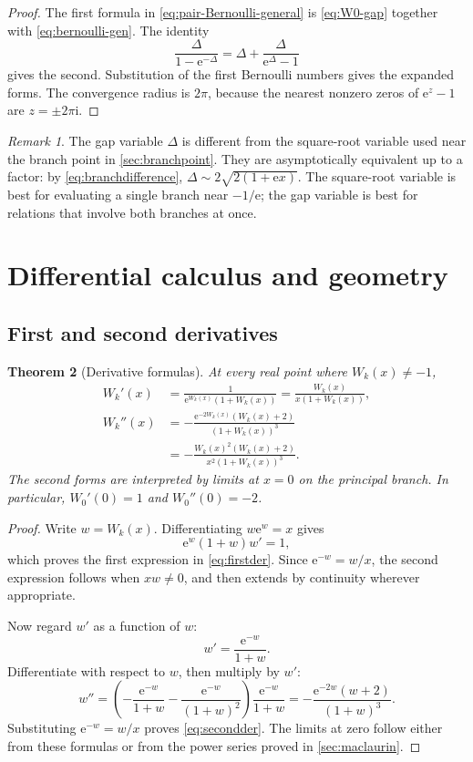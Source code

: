 \documentclass[11pt]{article}
\newtheorem{theorem}{Theorem}[section]
\theoremstyle{remark}
\newtheorem{remark}[theorem]{Remark}
\newcommand{\Wz}{W_0}
\newcommand{\ee}{\mathrm e}
\newcommand{\ii}{\mathrm i}
\begin{document}
\begin{proof}
The first formula in \eqref{eq:pair-Bernoulli-general} is
\eqref{eq:W0-gap} together with \eqref{eq:bernoulli-gen}.  The identity
\[
       \frac{\Delta}{1-\ee^{-\Delta}}
       =\Delta+\frac{\Delta}{\ee^\Delta-1}
\]
gives the second.  Substitution of the first Bernoulli numbers gives the
expanded forms.  The convergence radius is \(2\pi\), because the nearest
nonzero zeros of \(\ee^z-1\) are \(z=\pm2\pi\ii\).
\end{proof}

\begin{remark}
The gap variable \(\Delta\) is different from the square-root variable used
near the branch point in \cref{sec:branchpoint}.  They are asymptotically
equivalent up to a factor: by \eqref{eq:branchdifference},
\(\Delta\sim2\sqrt{2(1+\ee x)}\).  The square-root variable is best for
evaluating a single branch near \(-1/\ee\); the gap variable is best for
relations that involve both branches at once.
\end{remark}

\section{Differential calculus and geometry}\label{sec:calculus}

\subsection{First and second derivatives}

\begin{theorem}[Derivative formulas]\label{thm:derivatives}
At every real point where \(W_k(x)\neq-1\),
\begin{align}
 W_k'(x)
   &=\frac{1}{\ee^{W_k(x)}(1+W_k(x))}
     =\frac{W_k(x)}{x(1+W_k(x))},\label{eq:firstder}\\
 W_k''(x)
   &=-\frac{\ee^{-2W_k(x)}(W_k(x)+2)}
              {(1+W_k(x))^3}\label{eq:secondder-exp}\\
   &=-\frac{W_k(x)^2(W_k(x)+2)}
              {x^2(1+W_k(x))^3}.\label{eq:secondder}
\end{align}
The second forms are interpreted by limits at \(x=0\) on the principal
branch.  In particular, \(\Wz'(0)=1\) and \(\Wz''(0)=-2\).
\end{theorem}

\begin{proof}
Write \(w=W_k(x)\).  Differentiating \(w\ee^w=x\) gives
\[
 \ee^w(1+w)w'=1,
\]
which proves the first expression in \eqref{eq:firstder}.  Since
\(\ee^{-w}=w/x\), the second expression follows when \(xw\neq0\), and then
extends by continuity wherever appropriate.

Now regard \(w'\) as a function of \(w\):
\[
       w'=\frac{\ee^{-w}}{1+w}.
\]
Differentiate with respect to \(w\), then multiply by \(w'\):
\[
 w''=\left(-\frac{\ee^{-w}}{1+w}
           -\frac{\ee^{-w}}{(1+w)^2}\right)
           \frac{\ee^{-w}}{1+w}
     =-\frac{\ee^{-2w}(w+2)}{(1+w)^3}.
\]
Substituting \(\ee^{-w}=w/x\) proves \eqref{eq:secondder}.
The limits at zero follow either from these formulas or from the power series
proved in \cref{sec:maclaurin}.
\end{proof}
\end{document}
